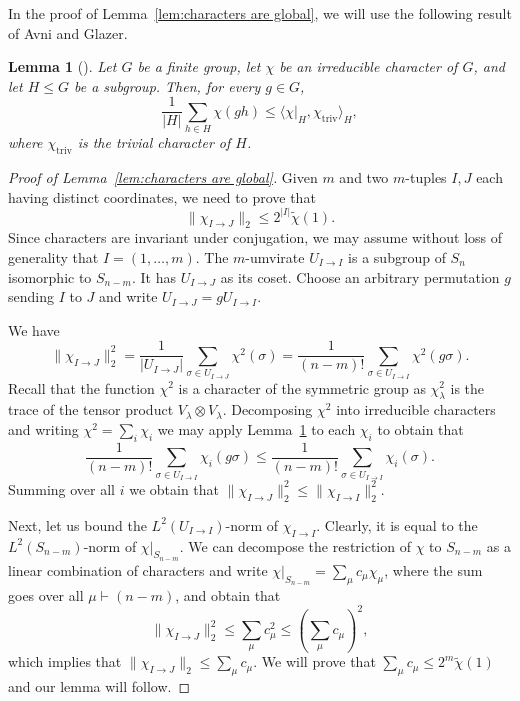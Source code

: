 \documentclass[11pt, letterpaper]{amsart}
\newtheorem{lem}[thm]{Lemma}
\renewcommand\le{\leqslant}
\begin{document}
In the proof of Lemma~\ref{lem:characters are global}, we will use the following result of Avni and Glazer.
\begin{lem}[{\cite[Lemma 2.7]{avni2022fourier}}]
\label{lem:glazer coset subgroup}
    Let $G$ be a finite group, let $\chi$ be an irreducible character of $G$, and let $H \le G$ be a subgroup. Then, for every $g \in G$,
    \[
        \frac{1}{|H|} \sum_{h \in H} \chi(gh) \le \langle \chi |_H, \chi_\text{triv}\rangle_H,
    \]
    where $\chi_\text{triv}$ is the trivial character of $H$.
\end{lem}

\begin{proof}[Proof of Lemma~\ref{lem:characters are global}]
    Given $m$ and two $m$-tuples $I,J$ each having distinct coordinates, we need to prove that
    \begin{equation}
    \label{eqn:proof characters are global}
        \|\chi_{I\to J}\|_2\le 2^{|I|}\tilde{\chi}(1).
    \end{equation}
    Since characters are invariant under conjugation, we may assume without loss of generality that $I=(1,\dots,m)$. The $m$-umvirate $U_{I\to I}$ is a subgroup of $S_n$ isomorphic to $S_{n-m}$. It has $U_{I\to J}$ as its coset. Choose an arbitrary permutation $g$ sending $I$ to $J$ and write $U_{I\to J} = gU_{I\to I}$.

We have 
    \[
        \|\chi_{I\to J}\|_2^2 = \frac{1}{|U_{I \to J}|} \sum_{\sigma \in U_{I \to J}} \chi^2(\sigma) = \frac{1}{(n-m)!} \sum_{\sigma \in U_{I\to I}} \chi^2(g\sigma).
    \]
   Recall that the function $\chi^2$ is a character of the symmetric group as $\chi_{\lambda}^2$ is the trace of the tensor product $V_{\lambda} \otimes V_{\lambda}$. Decomposing $\chi^2$ into irreducible characters and writing 
   $\chi^2= \sum_{i}\chi_i$
   we may apply Lemma~\ref{lem:glazer coset subgroup} to each $\chi_i$ to obtain that \[\frac{1}{(n-m)!}\sum_{\sigma \in U_{I\to I}}\chi_i(g\sigma) \le \frac{1}{(n-m)!}\sum_{\sigma \in U_{I\to I}}\chi_i(\sigma).\]
   Summing over all $i$ we obtain that $\|\chi_{I\to J}\|_2^2\le \|\chi_{I\to I}\|_2^2$. 

    Next, let us bound the $L^2(U_{I \to I})$-norm of $\chi_{I\to I}$. Clearly, it is equal to the $L^2(S_{n-m})$-norm of $\chi|_{S_{n-m}}$. We can decompose the restriction of $\chi$ to $S_{n-m}$ as a linear combination of characters and write $\chi|_{S_{n-m}} = \sum_{\mu} c_\mu \chi_\mu$, where the sum goes over all $\mu \vdash (n-m)$, and obtain that 
    \[
        \|\chi_{I\to J}\|_2^2 \le \sum_{\mu} c_\mu^2 \le \left(\sum_{\mu} c_\mu\right)^2,
    \]
    which implies that
    $\|\chi_{I\to J}\|_2 \le \sum_{\mu} c_\mu.$
    We will prove that $\sum_\mu c_\mu \le 2^m \tilde{\chi}(1)$ and our lemma will follow. 


\end{proof}
\end{document}
